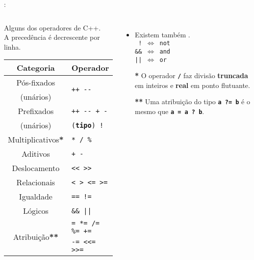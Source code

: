 \begin{frame}{\insertsection: \insertsubsection}
  \begin{columns}
    \begin{block}{\centering Alguns dos operadores de C++.\\{\small A precedência é decrescente por linha.}}
      \begin{tabular}{|c|l|}                                        \hline
        \textbf{Categoria} & \textbf{Operador}                   \\ \hline
        Pós-fixados        & \multirow{2}{*}{\texttt{++ {-}{-}}} \\
        (unários)          &                                     \\ \hline
        Prefixados         & \texttt{++ {-}{-} + -}              \\
        (unários)          & \texttt{(\textbf{\textcolor{CustomTeal}{tipo}}) !}          \\ \hline
        Multiplicativos\textcolor{CustomOrange}{\textbf{*}} & \texttt{* / \%} \\ \hline
        Aditivos           & \texttt{+ -}                        \\ \hline
        Deslocamento       & \texttt{{<}{<} {>}{>}}              \\ \hline
        Relacionais        & \texttt{< > <= >=}                  \\ \hline
        Igualdade          & \texttt{== !=}                      \\ \hline
        Lógicos            & \texttt{\&\& ||}                    \\ \hline
        \multirow{2}{*}{Atribuição\textcolor{CustomOrange}{\textbf{**}}} & \texttt{= *= /= \%= +=} \\
                           & \texttt{-= <{<}= >{>}=}             \\ \hline
      \end{tabular}
    \end{block}

    \begin{itemize}
    \item Existem também .\\
    \texttt{~!~$\Longleftrightarrow$~not}\\
    \texttt{\&\&~$\Longleftrightarrow$~and}\\
    \texttt{||~$\Longleftrightarrow$~or}\smallskip\\
    \item[\textbf{*}] O operador \textbf{\texttt{/}} faz divisão \textbf{truncada} em inteiros e \textbf{real} em ponto flutuante.
    \item[\textbf{**}] Uma atribuição do tipo \textbf{\texttt{a~?=~b}} é o mesmo que \textbf{\texttt{a~=~a~?~b}}.
    \end{itemize}
  \end{columns}
\end{frame}


